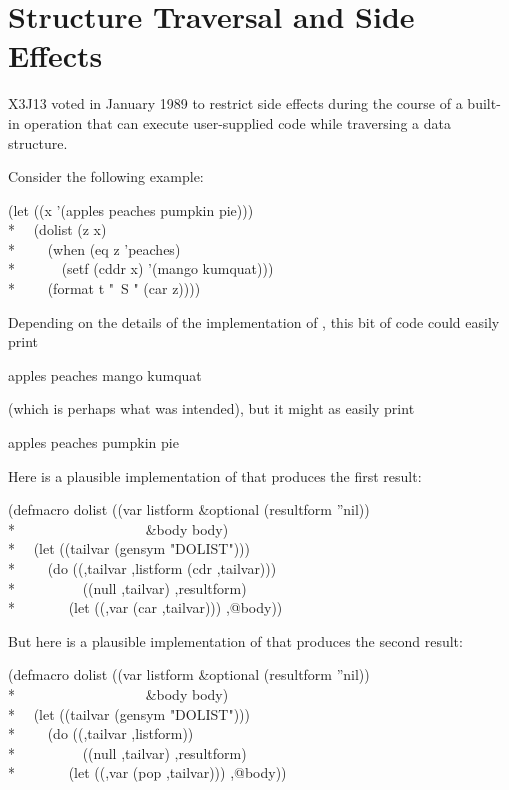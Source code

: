 \section{Structure Traversal and Side Effects}
\label{STRUCTURE-TRAVERSAL-SECTION}

X3J13 voted in January 1989 
to restrict side effects during the course
of a built-in operation that can execute user-supplied code while
traversing a data structure.

Consider the following example:
\begin{lisp}
(let ((x '(apples peaches pumpkin pie))) \\*
~~(dolist (z x) \\*
~~~~(when (eq z 'peaches) \\*
~~~~~~(setf (cddr x) '(mango kumquat))) \\*
~~~~(format t "~S " (car z))))
\end{lisp}
Depending on the details of the implementation of ,
this bit of code could easily print
\begin{lisp}
apples peaches mango kumquat
\end{lisp}
(which is perhaps what was intended), but it might as easily print
\begin{lisp}
apples peaches pumpkin pie
\end{lisp}
Here is a plausible implementation of  that
produces the first result:
\begin{lisp}
(defmacro dolist ((var listform \&optional (resultform ''nil)) \\*
~~~~~~~~~~~~~~~~~~\&body body) \\*
~~(let ((tailvar (gensym "DOLIST"))) \\*
~~~~{\Xbq}(do ((,tailvar ,listform (cdr ,tailvar))) \\*
~~~~~~~~~((null ,tailvar) ,resultform) \\*
~~~~~~~(let ((,var (car ,tailvar))) ,@body))
\end{lisp}
But here is a plausible implementation of  that
produces the second result:
\begin{lisp}
(defmacro dolist ((var listform \&optional (resultform ''nil)) \\*
~~~~~~~~~~~~~~~~~~\&body body) \\*
~~(let ((tailvar (gensym "DOLIST"))) \\*
~~~~{\Xbq}(do ((,tailvar ,listform)) \\*
~~~~~~~~~((null ,tailvar) ,resultform) \\*
~~~~~~~(let ((,var (pop ,tailvar))) ,@body))
\end{lisp}

